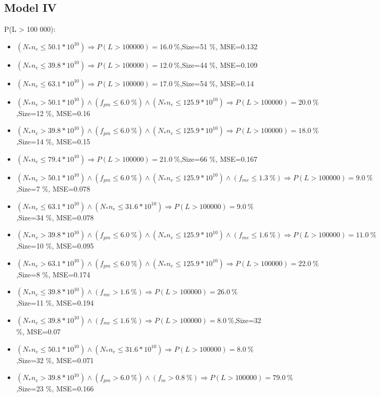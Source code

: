 \documentclass[numbered]{CSL}
\begin{document}
\subsection{Model IV}
P(L > 100 000):
\begin{itemize}
\item $(N_* n_e \leq 50.1 * 10^{10}) \Rightarrow P(L > 100 000) = 16.0~\%$,\hfill Size=51 \%, MSE=0.132
\item $(N_* n_e \leq 39.8 * 10^{10}) \Rightarrow P(L > 100 000) = 12.0~\%$,\hfill Size=44 \%, MSE=0.109
\item $(N_* n_e \leq 63.1 * 10^{10}) \Rightarrow P(L > 100 000) = 17.0~\%$,\hfill Size=54 \%, MSE=0.14
\item $(N_* n_e > 50.1 * 10^{10}) \land (f_{pm} \leq 6.0~\%) \land (N_* n_e \leq 125.9 * 10^{10}) \Rightarrow P(L > 100 000) = 20.0~\%$,\hfill Size=12 \%, MSE=0.16
\item $(N_* n_e > 39.8 * 10^{10}) \land (f_{pm} \leq 6.0~\%) \land (N_* n_e \leq 125.9 * 10^{10}) \Rightarrow P(L > 100 000) = 18.0~\%$,\hfill Size=14 \%, MSE=0.15
\item $(N_* n_e \leq 79.4 * 10^{10}) \Rightarrow P(L > 100 000) = 21.0~\%$,\hfill Size=66 \%, MSE=0.167
\item $(N_* n_e > 50.1 * 10^{10}) \land (f_{pm} \leq 6.0~\%) \land (N_* n_e \leq 125.9 * 10^{10}) \land (f_{me} \leq 1.3~\%) \Rightarrow P(L > 100 000) = 9.0~\%$,\hfill Size=7 \%, MSE=0.078
\item $(N_* n_e \leq 63.1 * 10^{10}) \land (N_* n_e \leq 31.6 * 10^{10}) \Rightarrow P(L > 100 000) = 9.0~\%$,\hfill Size=34 \%, MSE=0.078
\item $(N_* n_e > 39.8 * 10^{10}) \land (f_{pm} \leq 6.0~\%) \land (N_* n_e \leq 125.9 * 10^{10}) \land (f_{me} \leq 1.6~\%) \Rightarrow P(L > 100 000) = 11.0~\%$,\hfill Size=10 \%, MSE=0.095
\item $(N_* n_e > 63.1 * 10^{10}) \land (f_{pm} \leq 6.0~\%) \land (N_* n_e \leq 125.9 * 10^{10}) \Rightarrow P(L > 100 000) = 22.0~\%$,\hfill Size=8 \%, MSE=0.174
\item $(N_* n_e \leq 39.8 * 10^{10}) \land (f_{me} > 1.6~\%) \Rightarrow P(L > 100 000) = 26.0~\%$,\hfill Size=11 \%, MSE=0.194
\item $(N_* n_e \leq 39.8 * 10^{10}) \land (f_{me} \leq 1.6~\%) \Rightarrow P(L > 100 000) = 8.0~\%$,\hfill Size=32 \%, MSE=0.07
\item $(N_* n_e \leq 50.1 * 10^{10}) \land (N_* n_e \leq 31.6 * 10^{10}) \Rightarrow P(L > 100 000) = 8.0~\%$,\hfill Size=32 \%, MSE=0.071
\item $(N_* n_e > 39.8 * 10^{10}) \land (f_{pm} > 6.0~\%) \land (f_m > 0.8~\%) \Rightarrow P(L > 100 000) = 79.0~\%$,\hfill Size=23 \%, MSE=0.166

\end{itemize}
\end{document}
